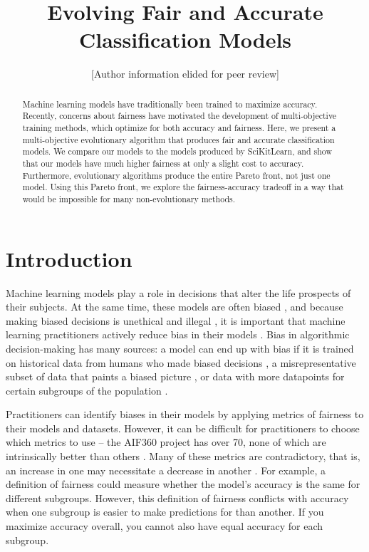 \documentclass[10pt]{acmart}
\title{Evolving Fair and Accurate Classification Models}
\author{[Author information elided for peer review]}
\begin{document}
\begin{abstract}
Machine learning models have traditionally been trained to maximize accuracy. Recently, concerns about fairness have motivated the development of multi-objective training methods, which optimize for both accuracy and fairness. Here, we present a multi-objective evolutionary algorithm that produces fair and accurate classification models. We compare our models to the models produced by SciKitLearn, and show that our models have much higher fairness at only a slight cost to accuracy. Furthermore, evolutionary algorithms produce the entire Pareto front, not just one model. Using this Pareto front, we explore the fairness-accuracy tradeoff in a way that would be impossible for many non-evolutionary methods.
\end{abstract}


\maketitle
\section{Introduction}
Machine learning models play a role in decisions that alter the life prospects of their subjects. At the same time, these models are often biased \citep{Angwin:2016}, and because making biased decisions is unethical and illegal \citep{Barocas:2016}, it is important that machine learning practitioners actively reduce bias in their models \citep{Binns:2017}. Bias in algorithmic decision-making has many sources: a model can end up with bias if it is trained on historical data from humans who made biased decisions \citep{Calders:2013}, a misrepresentative subset of data that paints a biased picture \citep{Suresh:2019}, or data with more datapoints for certain subgroups of the population \citep{Torralba:2011}.

Practitioners can identify biases in their models by applying metrics of fairness to their models and datasets. However, it can be difficult for practitioners to choose which metrics to use – the AIF360 project has over 70, none of which are intrinsically better than others \citep{Bellamy:2018}. Many of these metrics are contradictory, that is, an increase in one may necessitate a decrease in another \citep{Kleinberg:2016}. For example, a definition of fairness could measure whether the model’s accuracy is the same for different subgroups. However, this definition of fairness conflicts with accuracy when one subgroup is easier to make predictions for than another. If you maximize accuracy overall, you cannot also have equal accuracy for each subgroup.
\end{document}
